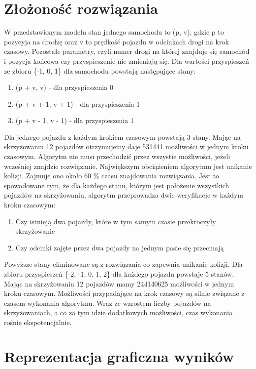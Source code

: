 \section{Złożoność rozwiązania}

W przedstawionym modelu stan jednego samochodu to (p, v), gdzie p to pozycyja na drodzę oraz v to prędkość pojazdu w odcinkach drogi na krok czasowy. Pozostałe parametry, czyli numer drogi na której znajduje się samochód i pozycja końcowa czy przyspieszenie nie zmieniają się. Dla wartości przyspieszeń ze zbioru \{-1, 0, 1\} dla samochodu powstają następujące stany:
\begin{enumerate}
\item (p + v, v) - dla przyspieszenia 0
\item (p + v + 1, v + 1) - dla przyspieszenia 1
\item (p + v - 1, v - 1) - dla przyspieszenia 1
\end{enumerate}
Dla jednego pojazdu z każdym krokiem czasowym powstają 3 stany. Mając na skrzyżowaniu 12 pojazdów otrzymujemy daje 531441 możliwości w jednym kroku czasowym. Algorytm nie musi przechodzić przez wszystie możliwości, jeżeli wcześniej znajdzie rozwiązanie.
\newline
\indent
Największym obciążeniem algorytmu jest unikanie kolizji. Zajmuje ono około 60 \% czasu znajdowania rozwiązania. Jest to spowodowane tym, że dla każdego stanu, którym jest położenie wszystkich pojazdów na skrzyżowaniu, algorytm przeprowadza dwie weryfikacje w każdym kroku czasowym:
\begin{enumerate}
\item Czy istnieją dwa pojazdy, które w tym samym czasie przekroczyły skrzyżowanie
\item Czy odcinki zajęte przez dwa pojazdy na jednym pasie się przecinają
\end{enumerate}
Powyższe stany eliminowane są z rozwiązania co zapewnia unikanie kolizji.
\newline
\indent
Dla zbioru przyspieszeń \{-2, -1, 0, 1, 2\} dla każdego pojazdu powstaje 5 stanów. Mając na skrzyżowaniu 12 pojazdów mamy 244140625 możliwości w jednym kroku czasowym. Możliwości przypadające na krok czasowy są silnie związane z czasem wykonania algorytmu. Wraz ze wzrostem liczby pojazdów na skrzyżowaniach, a co za tym idzie dodatkowych możliwości, czas wykonania rośnie ekspotencjalnie.
\section{Reprezentacja graficzna wyników}

